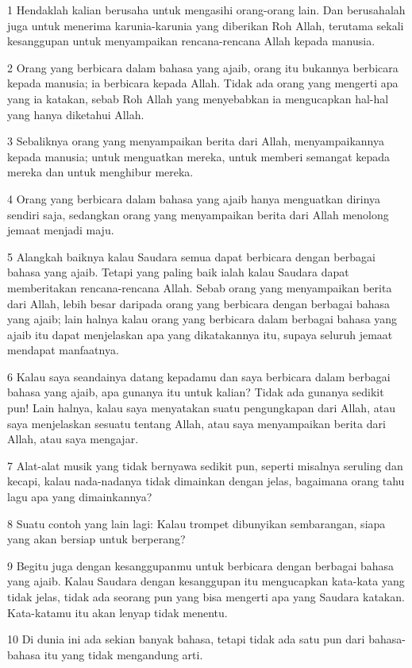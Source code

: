 \par 1 Hendaklah kalian berusaha untuk mengasihi orang-orang lain. Dan berusahalah juga untuk menerima karunia-karunia yang diberikan Roh Allah, terutama sekali kesanggupan untuk menyampaikan rencana-rencana Allah kepada manusia.
\par 2 Orang yang berbicara dalam bahasa yang ajaib, orang itu bukannya berbicara kepada manusia; ia berbicara kepada Allah. Tidak ada orang yang mengerti apa yang ia katakan, sebab Roh Allah yang menyebabkan ia mengucapkan hal-hal yang hanya diketahui Allah.
\par 3 Sebaliknya orang yang menyampaikan berita dari Allah, menyampaikannya kepada manusia; untuk menguatkan mereka, untuk memberi semangat kepada mereka dan untuk menghibur mereka.
\par 4 Orang yang berbicara dalam bahasa yang ajaib hanya menguatkan dirinya sendiri saja, sedangkan orang yang menyampaikan berita dari Allah menolong jemaat menjadi maju.
\par 5 Alangkah baiknya kalau Saudara semua dapat berbicara dengan berbagai bahasa yang ajaib. Tetapi yang paling baik ialah kalau Saudara dapat memberitakan rencana-rencana Allah. Sebab orang yang menyampaikan berita dari Allah, lebih besar daripada orang yang berbicara dengan berbagai bahasa yang ajaib; lain halnya kalau orang yang berbicara dalam berbagai bahasa yang ajaib itu dapat menjelaskan apa yang dikatakannya itu, supaya seluruh jemaat mendapat manfaatnya.
\par 6 Kalau saya seandainya datang kepadamu dan saya berbicara dalam berbagai bahasa yang ajaib, apa gunanya itu untuk kalian? Tidak ada gunanya sedikit pun! Lain halnya, kalau saya menyatakan suatu pengungkapan dari Allah, atau saya menjelaskan sesuatu tentang Allah, atau saya menyampaikan berita dari Allah, atau saya mengajar.
\par 7 Alat-alat musik yang tidak bernyawa sedikit pun, seperti misalnya seruling dan kecapi, kalau nada-nadanya tidak dimainkan dengan jelas, bagaimana orang tahu lagu apa yang dimainkannya?
\par 8 Suatu contoh yang lain lagi: Kalau trompet dibunyikan sembarangan, siapa yang akan bersiap untuk berperang?
\par 9 Begitu juga dengan kesanggupanmu untuk berbicara dengan berbagai bahasa yang ajaib. Kalau Saudara dengan kesanggupan itu mengucapkan kata-kata yang tidak jelas, tidak ada seorang pun yang bisa mengerti apa yang Saudara katakan. Kata-katamu itu akan lenyap tidak menentu.
\par 10 Di dunia ini ada sekian banyak bahasa, tetapi tidak ada satu pun dari bahasa-bahasa itu yang tidak mengandung arti.
